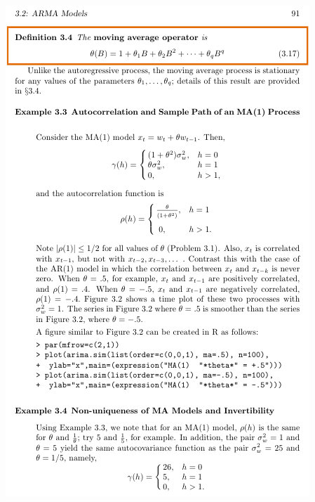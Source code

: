 \documentclass{article}
\begin{document}
\newpage\includegraphics[width=.9\textwidth]{shumway8}
\end{document}
